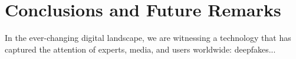 \documentclass[../main.tex]{subfiles}
\begin{document}
\section{Conclusions and Future Remarks}\label{sec:conclusions}
In the ever-changing digital landscape, we are witnessing a technology that has captured the attention of experts, media, and users worldwide: deepfakes...
\end{document}

